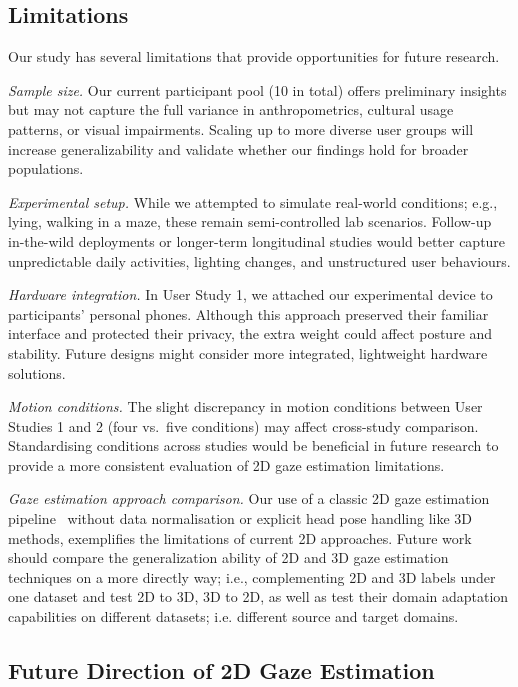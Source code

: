 \subsection{Limitations}

Our study has several limitations that provide opportunities for future research.

\noindent\textit{Sample size.} Our current participant pool (10 in total) offers preliminary insights but may not capture the full variance in anthropometrics, cultural usage patterns, or visual impairments. Scaling up to more diverse user groups will increase generalizability and validate whether our findings hold for broader populations.


\noindent\textit{Experimental setup.} While we attempted to simulate real-world conditions; e.g., lying, walking in a maze, these remain semi-controlled lab scenarios. Follow-up in-the-wild deployments or longer-term longitudinal studies would better capture unpredictable daily activities, lighting changes, and unstructured user behaviours.


\noindent\textit{Hardware integration.} In User Study 1, we attached our experimental device to participants’ personal phones. Although this approach preserved their familiar interface and protected their privacy, the extra weight could affect posture and stability. Future designs might consider more integrated, lightweight hardware solutions.


\noindent\textit{Motion conditions.} The slight discrepancy in motion conditions between User Studies 1 and 2 (four vs.\ five conditions) may affect cross-study comparison. Standardising conditions across studies would be beneficial in future research to provide a more consistent evaluation of 2D gaze estimation limitations.


\noindent\textit{Gaze estimation approach comparison.} Our use of a classic 2D gaze estimation pipeline~\cite{krafka2016eye, bao2021adaptive}  without data normalisation or explicit head pose handling like 3D methods, exemplifies the limitations of current 2D approaches. Future work should compare the generalization ability of 2D and 3D gaze estimation techniques on a more directly way; i.e., complementing 2D and 3D labels under one dataset and test 2D to 3D, 3D to 2D, as well as test their domain adaptation capabilities on different datasets; i.e. different source and target domains.


\subsection{Future Direction of 2D Gaze Estimation}

